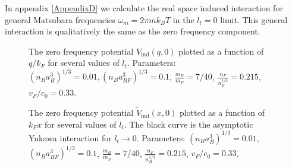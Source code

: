 In appendix \ref{AppendixD} we calculate the real space induced interaction for general Matsubara frequencies $\omega_m = 2\pi m k_BT$ in the $l_t = 0$ limit. This general interaction is qualitatively the same as the zero frequency component.  

\begin{figure} 
\begin{center}  
  
\caption{The zero frequency potential $V_{\text{ind}}(q,0)$ plotted as a function of $q/k_F$ for several values of $l_t$. Parameters: $(n_Ba_B^3)^{1/3} = 0.01, (n_Ba_{BF}^3)^{1/3} = 0.1$, $\frac{m_B}{m_F} = 7/40$, $\frac{n_F}{n_B^{1/3}} = 0.215$, $v_F/c_0 = 0.33$.}  
\label{fig.Vq}  
\end{center}    
\end{figure}

\begin{figure} 
\begin{center}  
  
\caption{The zero frequency potential $\tilde{V}_{\text{ind}}(x,0)$ plotted as a function of $k_Fx$ for several values of $l_t$. The black curve is the asymptotic Yukawa interaction for $l_t \to 0$. Parameters: $(n_Ba_B^3)^{1/3} = 0.01$, $(n_Ba_{BF}^3)^{1/3} = 0.1$, $\frac{m_B}{m_F} = 7/40$, $\frac{n_F}{n_B^{1/3}} = 0.215$, $v_F/c_0 = 0.33$.}  
\label{fig.Vx}  
\end{center}    
\end{figure}



